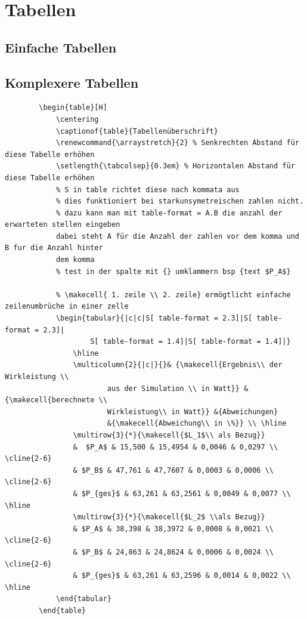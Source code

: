 \documentclass[
12pt,
a4paper,
headings=small,                    %
bibliography=totoc,                %
listof=totoc,                      %
parskip=half*,                     %
]{scrartcl}                        %
\renewcommand{\arraystretch}{1.15}
\begin{document}
	\section{Tabellen}
	\subsection{Einfache Tabellen}
	
	\subsection{Komplexere Tabellen}
	\begin{verbatim}
		\begin{table}[H]
			\centering
			\captionof{table}{Tabellenüberschrift}
			\renewcommand{\arraystretch}{2} % Senkrechten Abstand für diese Tabelle erhöhen
			\setlength{\tabcolsep}{0.3em} % Horizontalen Abstand für diese Tabelle erhöhen
			% S in table richtet diese nach kommata aus
			% dies funktioniert bei starkunsymetreischen zahlen nicht.
			% dazu kann man mit table-format = A.B die anzahl der erwarteten stellen eingeben 
			dabei steht A für die Anzahl der zahlen vor dem komma und B fur die Anzahl hinter 
			dem komma
			% test in der spalte mit {} umklammern bsp {text $P_A$}
			
			% \makecell{ 1. zeile \\ 2. zeile} ermögtlicht einfache zeilenumbrüche in einer zelle
			\begin{tabular}{|c|c|S[ table-format = 2.3]|S[ table-format = 2.3]|
					S[ table-format = 1.4]|S[ table-format = 1.4]|}
				\hline
				\multicolumn{2}{|c|}{}& {\makecell{Ergebnis\\ der Wirkleistung \\ 
						aus der Simulation \\ in Watt}} & {\makecell{berechnete \\
						Wirkleistung\\ in Watt}} &{Abweichungen} 
					    &{\makecell{Abweichung\\ in \%}} \\ \hline
				\multirow{3}{*}{\makecell{$L_1$\\ als Bezug}} 
				&  $P_A$ & 15,500 & 15,4954 & 0,0046 & 0,0297 \\ \cline{2-6} 
				& $P_B$ & 47,761 & 47,7607 & 0,0003 & 0,0006 \\ \cline{2-6} 
				& $P_{ges}$ & 63,261 & 63,2561 & 0,0049 & 0,0077 \\ \hline
				\multirow{3}{*}{\makecell{$L_2$ \\als Bezug}}
				& $P_A$ & 38,398 & 38,3972 & 0,0008 & 0,0021 \\ \cline{2-6} 
				& $P_B$ & 24,863 & 24,8624 & 0,0006 & 0,0024 \\ \cline{2-6} 
				& $P_{ges}$ & 63,261 & 63,2596 & 0,0014 & 0,0022 \\ \hline
			\end{tabular}
		\end{table}
	\end{verbatim}
\end{document}
